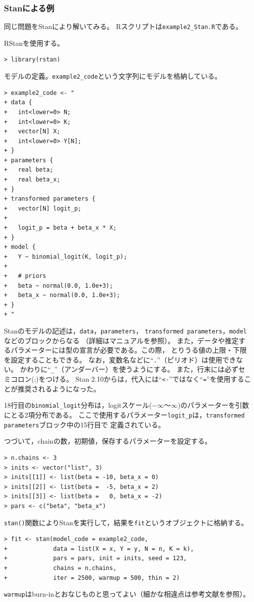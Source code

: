 \documentclass[11pt,uplatex]{jsarticle}
\begin{document}

\subsubsection{Stanによる例}
同じ問題を\textsf{Stan}により解いてみる。
\textsf{R}スクリプトは\texttt{example2\_Stan.R}である。

RStanを使用する。
\begin{lstlisting}
> library(rstan)
\end{lstlisting}

モデルの定義。\texttt{example2\_code}という文字列にモデルを格納している。
\begin{lstlisting}
> example2_code <- "
+ data {
+   int<lower=0> N;
+   int<lower=0> K;
+   vector[N] X;
+   int<lower=0> Y[N];
+ }
+ parameters {
+   real beta;
+   real beta_x;
+ }
+ transformed parameters {
+   vector[N] logit_p;
+ 
+   logit_p = beta + beta_x * X;
+ }
+ model {
+   Y ~ binomial_logit(K, logit_p);
+   
+   # priors
+   beta ~ normal(0.0, 1.0e+3);
+   beta_x ~ normal(0.0, 1.0e+3);
+ }
+ "
\end{lstlisting}
\noindent
Stanのモデルの記述は，\texttt{data}，\texttt{parameters}，
\texttt{transformed parameters}，\texttt{model}などのブロックからなる
（詳細はマニュアルを参照）。
また，データや推定するパラメーターには型の宣言が必要である。この際，
とりうる値の上限・下限を設定することもできる。
なお，変数名などに``\texttt{.}''（ピリオド）は使用できない。
かわりに``\texttt{\_}''（アンダーバー）を使うようにする。
また，行末には必ずセミコロン(;)をつける。
Stan 2.10からは，代入には``\texttt{<-}''ではなく``\texttt{=}''を使用することが推奨されるようになった。

18行目の\texttt{binomial\_logit}分布は，logitスケール($-\infty$〜$\infty$)のパラメーターを引数にとる2項分布である。
ここで使用するパラメーター\texttt{logit\_p}は，\texttt{transformed parameters}ブロック中の15行目で
定義されている。

つづいて，chainの数，初期値，保存するパラメーターを設定する。
\begin{lstlisting}
> n.chains <- 3
> inits <- vector("list", 3)
> inits[[1]] <- list(beta = -10, beta_x = 0)
> inits[[2]] <- list(beta =  -5, beta_x = 2)
> inits[[3]] <- list(beta =   0, beta_x = -2)
> pars <- c("beta", "beta_x")
\end{lstlisting}
\texttt{stan()}関数によりStanを実行して，結果を\texttt{fit}というオブジェクトに格納する。
\begin{lstlisting}
> fit <- stan(model_code = example2_code,
+             data = list(X = x, Y = y, N = n, K = k),
+             pars = pars, init = inits, seed = 123,
+             chains = n.chains,
+             iter = 2500, warmup = 500, thin = 2)
\end{lstlisting}
\noindent
\texttt{warmup}はburn-inとおなじものと思ってよい（細かな相違点は参考文献\cite{BDA3}を参照）。
\end{document}
